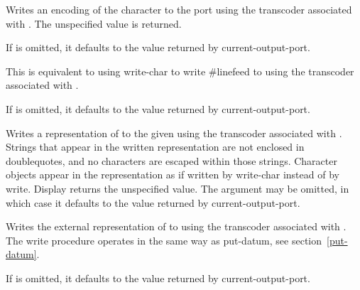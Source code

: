 \begin{entry}{%
}

Writes an encoding of the character  to the port using the
transcoder associated with . The unspecified value is
returned.

If  is omitted, it defaults to the value returned by
{\cf current-output-port}.
\end{entry}

\begin{entry}{%
}

This is equivalent to using {\cf write-char} to write {\cf \#linefeed}
to  using the transcoder associated with .

If  is omitted, it defaults to the value returned by
{\cf current-output-port}.
\end{entry}

\begin{entry}{%
}

Writes a representation of  to the given  using the
transcoder associated with .  Strings that appear in
the written representation are not enclosed in doublequotes, and no
characters are escaped within those strings.  Character objects appear
in the representation as if written by {\cf write-char} instead of by
{\cf write}.  {\cf Display} returns the unspecified value.  The
 argument may be omitted, in which case it defaults
to the value returned by {\cf current-output-port}.
\end{entry}

\begin{entry}{%
}

Writes the external representation of  to 
using the transcoder associated with .  The {\cf write}
procedure operates in the same way as {\cf put-datum}, see
section~\ref{put-datum}.

If  is omitted, it defaults to the value returned by
{\cf current-output-port}.
\end{entry}


